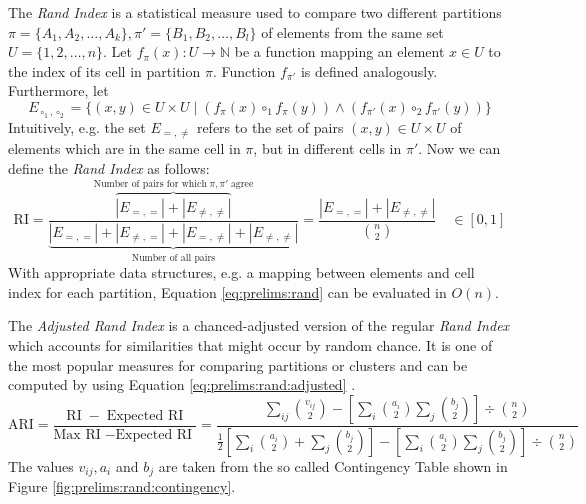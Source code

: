 		The \textit{Rand Index} is a statistical measure used to compare two different partitions $\pi = \{ A_1, A_2, \ldots, A_k \}, \pi' = \{ B_1, B_2, \ldots, B_l \}$ of elements from the same set $U = \{ 1, 2, \ldots, n \}$.
		Let $f_\pi(x): U \rightarrow \mathbb{N}$ be a function mapping an element $x \in U$ to the index of its cell in partition $\pi$. Function $f_{\pi'}$ is defined analogously.
		Furthermore, let
		\begin{equation*}
			E_{\circ_1, \circ_2} = \{ (x, y) \in U \times U \mid (f_\pi(x) \circ_1 f_\pi(y)) \land (f_{\pi'}(x) \circ_2 f_{\pi'}(y)) \}
		\end{equation*}
		Intuitively, e.g. the set $E_{=, \not=}$ refers to the set of pairs $(x, y) \in U \times U$ of elements which are in the same cell in $\pi$, but in different cells in $\pi'$.
		Now we can define the \textit{Rand Index} as follows:
		\begin{equation}
			\label{eq:prelims:rand}
			\mathrm{RI} = \frac{\overbrace{|E_{=, =}| + |E_{\not=, \not=}|}^{\text{Number of pairs for which}\; \pi, \pi' \;\text{agree}}}{\underbrace{|E_{=, =}| + |E_{\not=, =}| + |E_{=, \not=}| + |E_{\not=, \not=}|}_{\text{Number of all pairs}}} = \frac{|E_{=, =}| + |E_{\not=, \not=}|}{\binom{n}{2}} \quad \in [0, 1]
		\end{equation}
		With appropriate data structures, e.g. a mapping between elements and cell index for each partition, Equation \ref{eq:prelims:rand} can be evaluated in $O(n)$.

		The \textit{Adjusted Rand Index} is a chanced-adjusted version of the regular \textit{Rand Index} which accounts for similarities that might occur by random chance.
		It is one of the most popular measures for comparing partitions or clusters and can be computed by using Equation \ref{eq:prelims:rand:adjusted} \cite{sundqvistAdjustingAdjustedRand2020}.
		\begin{equation}
			\label{eq:prelims:rand:adjusted}
			\mathrm{ARI} = \frac{\mathrm{RI}\; - \;\text{Expected RI}}{\text{Max RI}\; - \text{Expected RI} \;} = \frac{\sum\nolimits_{ij} \binom{v_{ij}}{2} - \left[ \sum\nolimits_i \binom{a_i}{2} \sum\nolimits_j \binom{b_j}{2} \right] \div \binom{n}{2}}{\frac{1}{2} \left[ \sum\nolimits_i \binom{a_i}{2} +  \sum\nolimits_j \binom{b_j}{2} \right] - \left[ \sum\nolimits_i \binom{a_i}{2} \sum\nolimits_j \binom{b_j}{2} \right] \div \binom{n}{2}}
		\end{equation}
		The values $v_{ij}, a_i$ and $b_j$ are taken from the so called Contingency Table shown in Figure \ref{fig:prelims:rand:contingency}.

